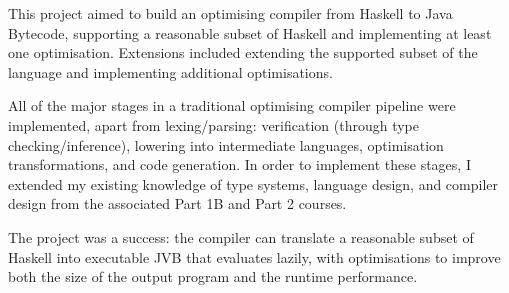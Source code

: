 \documentclass[dissertation.tex]{subfiles}
\begin{document}
This project aimed to build an optimising compiler from Haskell to Java Bytecode, supporting a reasonable subset of Haskell and implementing at least one optimisation. Extensions included extending the supported subset of the language and implementing additional optimisations.

All of the major stages in a traditional optimising compiler pipeline were implemented, apart from lexing/parsing: verification (through type checking/inference), lowering into intermediate languages, optimisation transformations, and code generation. In order to implement these stages, I extended my existing knowledge of type systems, language design, and compiler design from the associated Part 1B and Part 2 courses.

The project was a success: the compiler can translate a reasonable subset of Haskell into executable JVB that evaluates lazily, with optimisations to improve both the size of the output program and the runtime performance.

\end{document}
